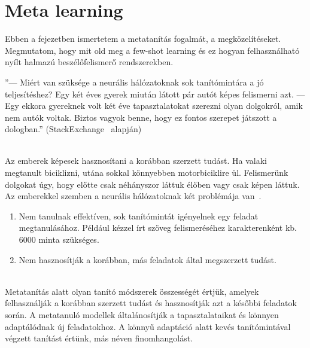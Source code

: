 \chapter{Meta learning}

Ebben a fejezetben ismertetem a metatanítás fogalmát, a megközelítéseket. Megmutatom, hogy mit old meg a few-shot learning és ez hogyan felhasználható nyílt halmazú beszélőfelismerő rendszerekben.
	 

\begin{displayquote}
	''--- Miért van szüksége a neurális hálózatoknak sok tanítómintára a jó teljesítéshez? Egy két éves gyerek miután látott pár autót képes felismerni azt.
	--- Egy ekkora gyereknek volt két éve tapasztalatokat szerezni olyan dolgokról, amik nem autók voltak. Biztos vagyok benne, hogy ez fontos szerepet játszott a dologban.''\newline
	\null\hfill (StackExchange~\cite{meta_learning_quotation} alapján)
\end{displayquote}
\ \\
Az emberek képesek hasznosítani a korábban szerzett tudást. Ha valaki megtanult biciklizni, utána sokkal
könnyebben motorbiciklire ül. Felismerünk dolgokat úgy, hogy előtte csak néhányszor láttuk élőben vagy csak képen láttuk.
\newline
\newline
Az emberekkel szemben a neurális hálózatoknak két problémája van~\cite{RL_meta_learning}.

\begin{enumerate}
	\item Nem tanulnak effektíven, sok tanítómintát igényelnek
	egy feladat megtanulásához. Például kézzel írt szöveg felismeréséhez karakterenként kb. 6000 minta szükséges.
	\item Nem hasznosítják a korábban, más feladatok által megszerzett tudást.
\end{enumerate}


\ \\
Metatanítás alatt olyan tanító módszerek
összességét értjük, amelyek felhasználják a korábban szerzett tudást és hasznosítják azt a későbbi
feladatok során. A metatanuló modellek általánosítják a tapasztalataikat és könnyen adaptálódnak új feladatokhoz. A könnyű adaptáció alatt kevés tanítómintával végzett tanítást értünk, más néven finomhangolást.

